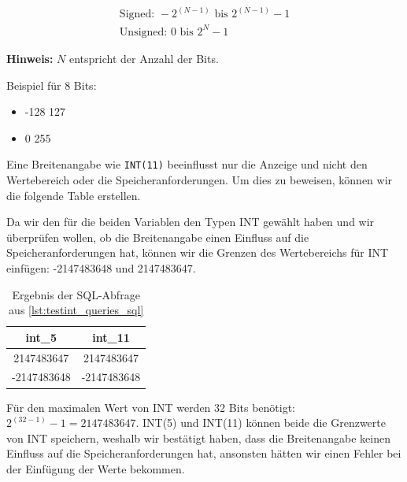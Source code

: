 \vspace{-4mm}
\begin{gather}
    \text{Signed: } -2^{(N-1)} \text{ bis } 2^{(N-1)} - 1\label{eq:equation-signed} \\
    \text{Unsigned: } 0 \text{ bis } 2^N - 1\label{eq:equation-unsigned}
\end{gather}

\textbf{Hinweis:} $N$ entspricht der Anzahl der Bits.
\vspace{4pt}

Beispiel für 8 Bits:
\begin{itemize}
    \item {} -128  127
    \item {} 0  255
\end{itemize}

Eine Breitenangabe wie \texttt{INT(11)} beeinflusst nur die Anzeige und nicht den Wertebereich oder die Speicheranforderungen.
Um dies zu beweisen, können wir die folgende Table erstellen.



Da wir den für die beiden Variablen den Typen INT gewählt haben und wir überprüfen wollen, ob die Breitenangabe einen Einfluss auf die Speicheranforderungen hat, können wir die Grenzen des Wertebereichs für INT einfügen: -2147483648 und 2147483647.


\begin{table}[h!]
    \centering
    \caption{Ergebnis der SQL-Abfrage aus \ref{lst:testint_queries_sql}}
    \begin{tabular}{|c|c|}
        \hline
        \textbf{int\_5} & \textbf{int\_11} \\ \hline
        2147483647 & 2147483647 \\ \hline
        -2147483648 & -2147483648 \\ \hline
    \end{tabular}
    \label{tab:int_values}
\end{table}
Für den maximalen Wert von INT werden 32 Bits benötigt: $2^{(32-1)} - 1 = 2147483647$.
INT(5) und INT(11) können beide die Grenzwerte von INT speichern, weshalb wir bestätigt haben, dass die Breitenangabe keinen Einfluss auf die Speicheranforderungen hat, ansonsten hätten wir einen Fehler bei der Einfügung der Werte bekommen.

